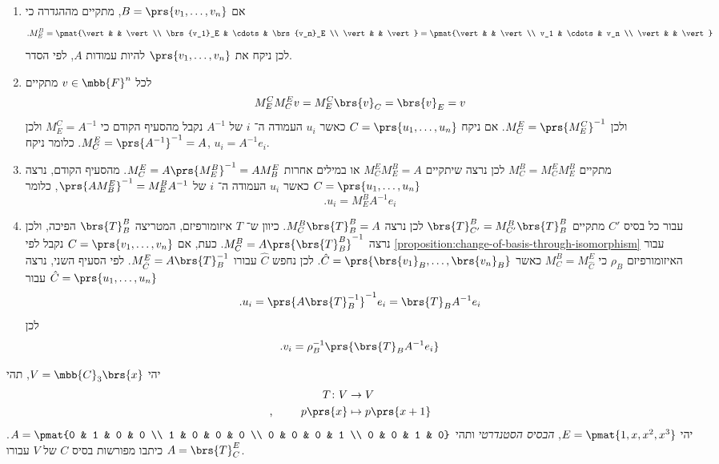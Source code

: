 \documentclass[a4paper,10pt,twoside,openany]{book}
\begin{document}
\begin{solution}
\begin{enumerate}
\item
אם
$B = \prs{v_1, \ldots, v_n}$,
מתקיים מההגדרה כי
\[\text{.} M^B_E = \pmat{\vert & & \vert \\ \brs{v_1}_E & \cdots & \brs{v_n}_E \\ \vert & & \vert} = \pmat{\vert & & \vert \\ v_1 & \cdots & v_n \\ \vert & & \vert}\]
לכן ניקח את
$\prs{v_1, \ldots, v_n}$
להיות עמודות
$A$,
לפי הסדר.

\item
לכל
$v \in \mbb{F}^n$
מתקיים
\[M^C_E M^E_C v = M^C_E \brs{v}_C = \brs{v}_E = v\]
ולכן
$M^E_C = \prs{M^C_E}^{-1}$.
אם ניקח
$C = \prs{u_1, \ldots, u_n}$
כאשר
$u_i$
העמודה ה־%
$i$
של
$A^{-1}$
נקבל מהסעיף הקודם כי
$M^C_E = A^{-1}$
ולכן
$M^E_C = \prs{A^{-1}}^{-1} = A$.
כלומר ניקח,
$u_i = A^{-1} e_i$.

\item
מתקיים
$M^B_C = M^E_C M^B_E$
לכן נרצה שיתקיים
$M^E_C M^B_E = A$
או במילים אחרות
$M^E_C = A \prs{M^B_E}^{-1} = A M^E_B$.
מהסעיף הקודם, נרצה
$C = \prs{u_1, \ldots, u_n}$
כאשר
$u_i$
העמודה ה־%
$i$
של
$\prs{A M^E_B}^{-1} = M^B_E A^{-1}$,
כלומר
\[\text{.} u_i = M^B_E A^{-1} e_i\]

\item
עבור כל בסיס
$C'$
מתקיים
$\brs{T}^B_{C'} = M^B_{C'} \brs{T}^B_B$
לכן נרצה
$M^B_C \brs{T}^B_B = A$.
כיוון ש־%
$T$
איזומורפיזם, המטריצה
$\brs{T}^B_B$
הפיכה, ולכן נרצה
$M^B_C = A \prs{\brs{T}^B_B}^{-1}$.
כעת, אם
$C = \prs{v_1, \ldots, v_n}$
נקבל לפי
\ref{proposition:change-of-basis-through-isomorphism}
עבור האיזומורפיזם
$\rho_B$
כי
$M^B_C = M^E_{\hat{C}}$
כאשר
$\hat{C} = \prs{\brs{v_1}_B, \ldots, \brs{v_n}_B}$.
לכן נחפש
$\hat{C}$
עבורו
$M^E_{\hat{C}} = A \brs{T}_B^{-1}$.
לפי הסעיף השני, נרצה
$\hat{C} = \prs{u_1, \ldots, u_n}$
עבור
\[\text{.} u_i = \prs{A \brs{T}_B^{-1}}^{-1} e_i = \brs{T}_B A^{-1} e_i\]
לכן
\[\text{.} v_i = \rho_B^{-1} \prs{\brs{T}_B A^{-1} e_i}\]
\end{enumerate}
\end{solution}

\begin{exercisechap}
יהי
$V = \mbb{C}_3\brs{x}$,
תהי
\begin{align*}
T \colon V &\to V \\
\text{,} \hphantom{lalala} p\prs{x} &\mapsto p\prs{x+1}
\end{align*}
יהי
$E = \pmat{1,x,x^2,x^3}$,
\emph{הבסיס הסטנדרטי}
ותהי
$A = \pmat{0 & 1 & 0 & 0 \\ 1 & 0 & 0 & 0 \\ 0 & 0 & 0 & 1 \\ 0 & 0 & 1 & 0}$.
כיתבו מפורשות בסיס
$C$
של
$V$
עבורו
$A = \brs{T}^E_C$.
\end{exercisechap}
\end{document}
